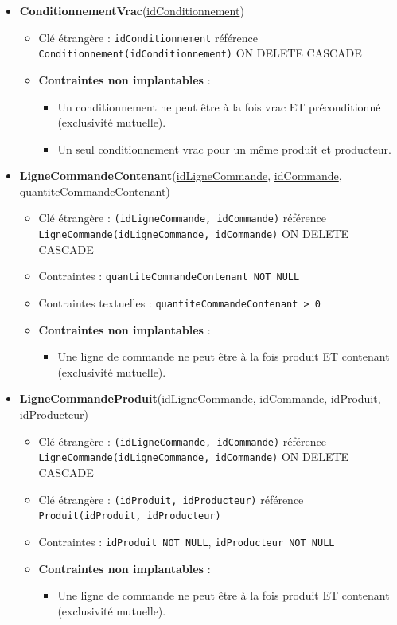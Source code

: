\begin{itemize}
    \item \textbf{ConditionnementVrac}(\underline{idConditionnement})
    \begin{itemize}
        \item Clé étrangère : \texttt{idConditionnement} référence \texttt{Conditionnement(idConditionnement)} ON DELETE CASCADE
        \item \textbf{Contraintes non implantables} :
        \begin{itemize}
            \item Un conditionnement ne peut être à la fois vrac ET préconditionné (exclusivité mutuelle).
            \item Un seul conditionnement vrac pour un même produit et producteur.
        \end{itemize}
    \end{itemize}
    
    \item \textbf{LigneCommandeContenant}(\underline{idLigneCommande}, \underline{idCommande}, quantiteCommandeContenant)
    \begin{itemize}
        \item Clé étrangère : \texttt{(idLigneCommande, idCommande)} référence \texttt{LigneCommande(idLigneCommande, idCommande)} ON DELETE CASCADE
        \item Contraintes : \texttt{quantiteCommandeContenant NOT NULL}
        \item Contraintes textuelles : \texttt{quantiteCommandeContenant > 0}
        \item \textbf{Contraintes non implantables} :
        \begin{itemize}
            \item Une ligne de commande ne peut être à la fois produit ET contenant (exclusivité mutuelle).
        \end{itemize}
    \end{itemize}
    
    \item \textbf{LigneCommandeProduit}(\underline{idLigneCommande}, \underline{idCommande}, idProduit, idProducteur)
    \begin{itemize}
        \item Clé étrangère : \texttt{(idLigneCommande, idCommande)} référence \texttt{LigneCommande(idLigneCommande, idCommande)} ON DELETE CASCADE
        \item Clé étrangère : \texttt{(idProduit, idProducteur)} référence \texttt{Produit(idProduit, idProducteur)}
        \item Contraintes : \texttt{idProduit NOT NULL}, \texttt{idProducteur NOT NULL}
        \item \textbf{Contraintes non implantables} :
        \begin{itemize}
            \item Une ligne de commande ne peut être à la fois produit ET contenant (exclusivité mutuelle).
        \end{itemize}
    \end{itemize}
    

\end{itemize}
